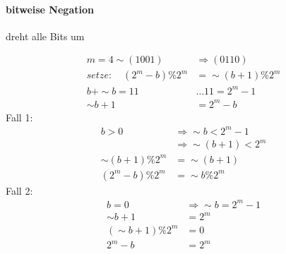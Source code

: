\documentclass{article}
\begin{document}
\paragraph{bitweise Negation}

	dreht alle Bits um

	\begin{align*}
		m=4 \sim (1001) &\Rightarrow (0110) \\
		setze: \quad (2^m -b) \% 2^m & = \sim (b+1) \% 2^m \\
		b + \sim b = 11 & \dots 11 = 2^m-1 \\
		\sim b+1 & = 2^m-b
	\end{align*}
	Fall 1:
	\begin{align*}
		b > 0 &\Rightarrow \sim b < 2^m-1 \\
		& \Rightarrow \sim (b+1) < 2^m \\
		\sim (b+1) \% 2^m & = \sim (b+1) \\
		(2^m -b) \% 2^m & = \sim b \% 2^m
	\end{align*}
	Fall 2:
	\begin{align*}
		 b=0 & \Rightarrow \sim b = 2^m-1 \\
		 \sim b+1 & = 2^m \\
		(\sim b+1) \% 2^m & = 0 \\
		2^m - b & = 2^m \\
	\end{align*}
\end{document}
